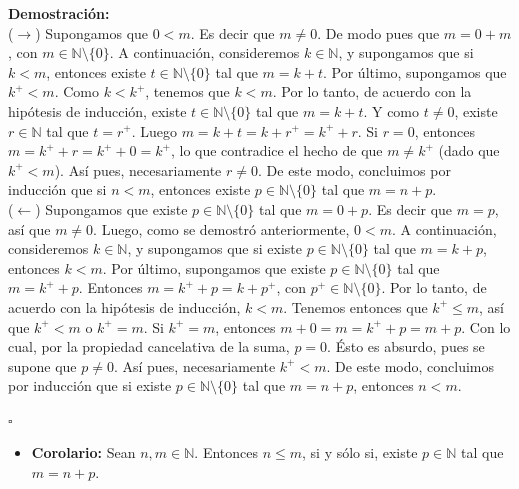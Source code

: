\documentclass[10 pt]{article}
\begin{document}
\Large{\textbf{Demostración:} \\

($\rightarrow$) Supongamos que $0<m$. Es decir que $m \neq 0$. De modo pues que $m=0+m$, con $m \in \mathbb N \setminus \{0\}$. A continuación, consideremos $k \in \mathbb N$, y supongamos que si $k<m$, entonces existe $t \in \mathbb N \setminus \{0\}$ tal que $m=k+t$. Por último, supongamos que $k^+<m$. Como $k<k^+$, tenemos que $k<m$. Por lo tanto, de acuerdo con la hipótesis de inducción, existe $t \in \mathbb N \setminus \{0\}$ tal que $m=k+t$. Y como $t \neq 0$, existe $r \in \mathbb N$ tal que $t=r^+$. Luego $m=k+t=k+r^+=k^++r$. Si $r=0$, entonces $m=k^++r=k^++0=k^+$, lo que contradice el hecho de que $m \neq k^+$ (dado que $k^+<m$). Así pues, necesariamente $r \neq 0$. De este modo, concluimos por inducción que si $n<m$, entonces existe $p \in \mathbb N \setminus \{0\}$ tal que $m=n+p$. \\

($\leftarrow$) Supongamos que existe $p \in \mathbb N \setminus \{0\}$ tal que $m=0+p$. Es decir que $m=p$, así que $m \neq 0$. Luego, como se demostró anteriormente, $0<m$. A continuación, consideremos $k \in \mathbb N$, y supongamos que si existe $p \in \mathbb N \setminus \{0\}$ tal que $m=k+p$, entonces $k<m$. Por último, supongamos que existe $p \in \mathbb N \setminus \{0\}$ tal que $m=k^++p$. Entonces $m=k^++p=k+p^+$, con $p^+ \in \mathbb N \setminus \{0\}$. Por lo tanto, de acuerdo con la hipótesis de inducción, $k<m$. Tenemos entonces que $k^+ \leq m$, así que $k^+<m$ o $k^+=m$. Si $k^+=m$, entonces $m+0=m=k^++p=m+p$. Con lo cual, por la propiedad cancelativa de la suma, $p=0$. Ésto es absurdo, pues se supone que $p \neq 0$. Así pues, necesariamente $k^+<m$. De este modo, concluimos por inducción que si existe $p \in \mathbb N \setminus \{0\}$ tal que $m=n+p$, entonces $n<m$.} \\

\begin{flushright}
    $\square$
\end{flushright}

\begin{itemize}
    \item \Large{\textbf{Corolario:} Sean $n,m \in \mathbb N$. Entonces $n \leq m$, si y sólo si, existe $p \in \mathbb N$ tal que $m=n+p$.} \\
\end{itemize}
\end{document}
